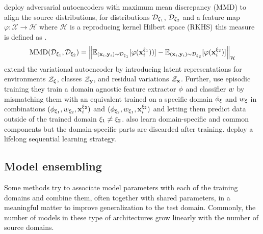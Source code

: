 \citet{LiPWK18} deploy adversarial autoencoders with maximum mean discrepancy (MMD) \citep{GrettonBRSS12} to align the source distributions, \ie for distributions $\mathcal{D}_{\xi_1}$, $\mathcal{D}_{\xi_2}$ and a feature map $\varphi: \mathcal{X} \rightarrow \mathcal{H}$ where $\mathcal{H}$ is a reproducing kernel Hilbert space (RKHS) this measure is defined as .
\begin{equation}
\label{eq:mmd}
    \operatorname{MMD}(\mathcal{D}_{\xi_1}, \mathcal{D}_{\xi_2})=\left\|\mathbb{E}_{(\mathbf{x}_i, \mathbf{y}_i) \sim \mathcal{D}_{\xi_1}}[\varphi(\mathbf{x}_i^{\xi_1}))]-\mathbb{E}_{(\mathbf{x}_i, \mathbf{y}_i) \sim \mathcal{D}_{\xi_2}}[\varphi(\mathbf{x}_i^{\xi_2})]\right\|_{\mathcal{H}}
\end{equation}
\citet{ilse2019diva} extend the variational autoencoder \citep{KingmaW13} by introducing latent representations for environments $\mathcal{Z}_\xi$, classes $\mathcal{Z}_{\mathbf{y}}$, and residual variations $\mathcal{Z}_{\mathbf{x}}$. Further, \citet{LiZYLSH19} use episodic training \ie they train a domain agnostic feature extractor $\phi$ and classifier $w$ by mismatching them with an equivalent trained on a specific domain $\phi_\xi$ and $w_\xi$ in combinations $(\phi_{\xi_1}, w_{\xi_2}, \mathbf{x}^{\xi_2}_i)$ and $(\phi_{\xi_2}, w_{\xi_1}, \mathbf{x}^{\xi_2}_i)$ and letting them predict data outside of the trained domain $\xi_1 \neq \xi_2$. \citet{piratla2020efficient} also learn domain-specific and common components but the domain-specific parts are discarded after training. \citet{li2020sequential} deploy a lifelong sequential learning strategy.

\subsection{Model ensembling}
\label{sec:model_ensembling}

Some methods try to associate model parameters with each of the training domains and combine them, often together with shared parameters, in a meaningful matter to improve generalization to the test domain. Commonly, the number of models in these type of architectures grow linearly with the number of source domains. 

